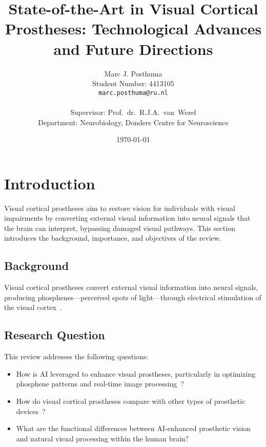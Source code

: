 \documentclass[twocolumn,10pt]{article}
\title{State-of-the-Art in Visual Cortical Prostheses: Technological Advances and Future Directions}
\author{
  Marc J. Posthuma\\
  Student Number: 4413105\\
  \texttt{marc.posthuma@ru.nl}\\
  \\
  Supervisor: Prof.\ dr.\ R.J.A.\ van\ Wezel\\
  Department: Neurobiology, Donders Centre for Neuroscience
}
\date{\today}
\begin{document}

\section{Introduction}\label{sec:intro}
Visual cortical prostheses aim to restore vision for individuals with visual impairments by converting external visual information into neural signals that the brain can interpret, bypassing damaged visual pathways. This section introduces the background, importance, and objectives of the review.

\subsection{Background}
Visual cortical prostheses convert external visual information into neural signals, producing phosphenes---perceived spots of light---through electrical stimulation of the visual cortex~\cite{vandergrintenBiologicallyPlausiblePhosphene2024}.

\subsection{Research Question}
This review addresses the following questions:
\begin{itemize}
    \item How is AI leveraged to enhance visual prostheses, particularly in optimizing phosphene patterns and real-time image processing~\cite{farnumNewVisionVisual2020}?
    \item How do visual cortical prostheses compare with other types of prosthetic devices~\cite{graniPersonalizedClosedloopStimulation2022}?
    \item What are the functional differences between AI-enhanced prosthetic vision and natural visual processing within the human brain?
\end{itemize}
\end{document}
